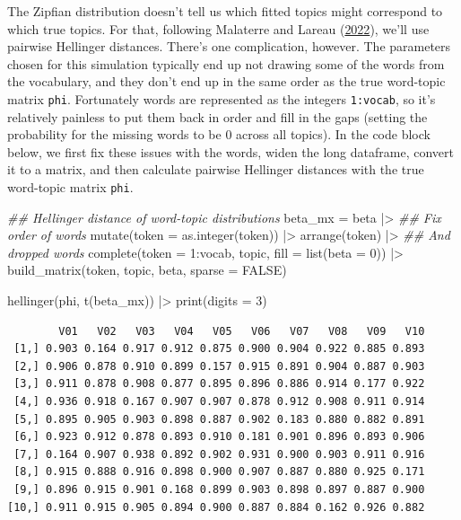 \documentclass[
]{article}
\newenvironment{Shaded}{\begin{snugshade}}{\end{snugshade}}
\newcommand{\AttributeTok}[1]{\textcolor[rgb]{0.40,0.45,0.13}{#1}}
\newcommand{\ConstantTok}[1]{\textcolor[rgb]{0.56,0.35,0.01}{#1}}
\newcommand{\DecValTok}[1]{\textcolor[rgb]{0.68,0.00,0.00}{#1}}
\newcommand{\DocumentationTok}[1]{\textcolor[rgb]{0.37,0.37,0.37}{\textit{#1}}}
\newcommand{\FunctionTok}[1]{\textcolor[rgb]{0.28,0.35,0.67}{#1}}
\newcommand{\NormalTok}[1]{\textcolor[rgb]{0.00,0.23,0.31}{#1}}
\newcommand{\OtherTok}[1]{\textcolor[rgb]{0.00,0.23,0.31}{#1}}
\newcommand{\SpecialCharTok}[1]{\textcolor[rgb]{0.37,0.37,0.37}{#1}}
\begin{document}
The Zipfian distribution doesn't tell us which fitted topics might
correspond to which true topics. For that, following Malaterre and
Lareau
(\protect\hyperlink{ref-MalaterreEarlyDaysContemporary2022}{2022}),
we'll use pairwise Hellinger distances. There's one complication,
however. The parameters chosen for this simulation typically end up not
drawing some of the words from the vocabulary, and they don't end up in
the same order as the true word-topic matrix \texttt{phi}. Fortunately
words are represented as the integers \texttt{1:vocab}, so it's
relatively painless to put them back in order and fill in the gaps
(setting the probability for the missing words to be 0 across all
topics). In the code block below, we first fix these issues with the
words, widen the long dataframe, convert it to a matrix, and then
calculate pairwise Hellinger distances with the true word-topic matrix
\texttt{phi}.

\begin{Shaded}
\begin{Highlighting}[]
\DocumentationTok{\#\# Hellinger distance of word{-}topic distributions}
\NormalTok{beta\_mx }\OtherTok{=}\NormalTok{ beta }\SpecialCharTok{|\textgreater{}}
    \DocumentationTok{\#\# Fix order of words}
    \FunctionTok{mutate}\NormalTok{(}\AttributeTok{token =} \FunctionTok{as.integer}\NormalTok{(token)) }\SpecialCharTok{|\textgreater{}}
    \FunctionTok{arrange}\NormalTok{(token) }\SpecialCharTok{|\textgreater{}}
    \DocumentationTok{\#\# And dropped words}
    \FunctionTok{complete}\NormalTok{(}\AttributeTok{token =} \DecValTok{1}\SpecialCharTok{:}\NormalTok{vocab, topic, }\AttributeTok{fill =} \FunctionTok{list}\NormalTok{(}\AttributeTok{beta =} \DecValTok{0}\NormalTok{)) }\SpecialCharTok{|\textgreater{}}
    \FunctionTok{build\_matrix}\NormalTok{(token, topic, beta, }\AttributeTok{sparse =} \ConstantTok{FALSE}\NormalTok{)}

\FunctionTok{hellinger}\NormalTok{(phi, }\FunctionTok{t}\NormalTok{(beta\_mx)) }\SpecialCharTok{|\textgreater{}} 
    \FunctionTok{print}\NormalTok{(}\AttributeTok{digits =} \DecValTok{3}\NormalTok{)}
\end{Highlighting}
\end{Shaded}

\begin{verbatim}
        V01   V02   V03   V04   V05   V06   V07   V08   V09   V10
 [1,] 0.903 0.164 0.917 0.912 0.875 0.900 0.904 0.922 0.885 0.893
 [2,] 0.906 0.878 0.910 0.899 0.157 0.915 0.891 0.904 0.887 0.903
 [3,] 0.911 0.878 0.908 0.877 0.895 0.896 0.886 0.914 0.177 0.922
 [4,] 0.936 0.918 0.167 0.907 0.907 0.878 0.912 0.908 0.911 0.914
 [5,] 0.895 0.905 0.903 0.898 0.887 0.902 0.183 0.880 0.882 0.891
 [6,] 0.923 0.912 0.878 0.893 0.910 0.181 0.901 0.896 0.893 0.906
 [7,] 0.164 0.907 0.938 0.892 0.902 0.931 0.900 0.903 0.911 0.916
 [8,] 0.915 0.888 0.916 0.898 0.900 0.907 0.887 0.880 0.925 0.171
 [9,] 0.896 0.915 0.901 0.168 0.899 0.903 0.898 0.897 0.887 0.900
[10,] 0.911 0.915 0.905 0.894 0.900 0.887 0.884 0.162 0.926 0.882
\end{verbatim}
\end{document}
